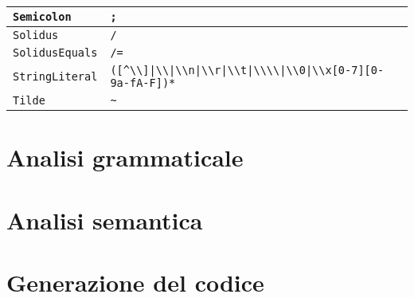 \begin{xltabular}{\textwidth}{l|X}
	\texttt{Semicolon} & \texttt{;} \\ \hline
	\texttt{Solidus} & \texttt{/} \\ \hline
	\texttt{SolidusEquals} & \texttt{/=} \\ \hline
	\texttt{StringLiteral} & \texttt{\textquotedbl ([\textasciicircum \textquotedbl \textbackslash \textbackslash]|\textbackslash \textbackslash \textquotedbl|\textbackslash \textbackslash n|\textbackslash \textbackslash r|\textbackslash \textbackslash t|\textbackslash \textbackslash \textbackslash \textbackslash|\textbackslash \textbackslash 0|\textbackslash \textbackslash x[0-7][0-9a-fA-F])*\textquotedbl} \\ \hline
	\texttt{Tilde} & \texttt{\textasciitilde}
\end{xltabular}


\section{Analisi grammaticale}
\label{sec:analisi-grammaticale}



\section{Analisi semantica}
\label{sec:analisi-semantica}

\section{Generazione del codice}
\label{sec:generazione-del-codice}
